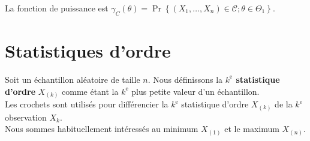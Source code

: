 \documentclass[10pt, french]{article}
\begin{document}
\begin{multicols*}{2}
La fonction de puissance est $\gamma_{C}(\theta)	=	\Pr\left\{(X_{1}, \dots, X_{n}) \in \mathcal{C} ; \theta \in \Theta_{1} \right\}$.



%	


\columnbreak
\section{Statistiques d'ordre}

Soit un échantillon aléatoire de taille $n$.
Nous définissons la \textbf{$k^{\text{e}}$ statistique d'ordre} $X_{(k)}$ comme étant la $k^{\text{e}}$ plus petite valeur d'un échantillon.\\
Les crochets sont utilisés pour différencier la $k^{\text{e}}$ statistique d'ordre $X_{(k)}$ de la $k^{\text{e}}$ observation $X_{k}$.\\

Nous sommes habituellement intéressés au minimum $X_{(1)}$ et le maximum $X_{(n)}$.


\end{multicols*}
\end{document}
